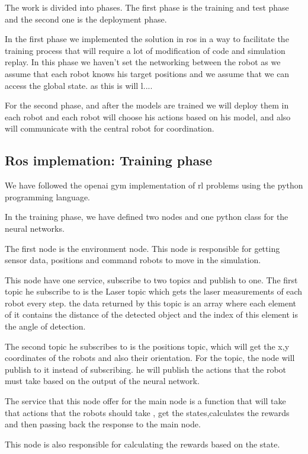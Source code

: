 \documentclass[12pt]{extarticle}
\begin{document}
The work is divided into phases. The first phase is the training and test phase and the second one is the deployment phase.

In the first phase we implemented the solution in ros in a way to facilitate the training process that will require a lot of modification of code and simulation replay. In this phase   we haven't set the networking between the robot as we assume that each robot knows his target positions and we assume that we can access the global state.  as this is will l....


For the second phase, and after the models are trained we will deploy them in each robot and each robot will choose his actions based on his model, and also will communicate with the central robot for coordination.


\subsection{Ros implemation: Training phase}

We have followed the openai gym implementation of  rl problems using the python programming language.

In the training phase, we have defined two nodes and one python class for the neural networks.
 

The first node is the environment node. This node is responsible for getting sensor data, positions and command robots to move in the simulation.

This node have one service, subscribe to  two topics and publish to one. The first topic he subscribe to is the Laser topic which gets the laser measurements of each robot every step. the data returned   by this topic is an array where each element of it contains the distance of the detected object and the index of this element is the angle of detection.


The second topic he subscribes to is the positions topic, which will get the x,y coordinates of the robots and also their orientation. For the topic, the node will publish to it instead of subscribing. he will publish the actions that the robot must take based on the output of the neural network.

The service that this node offer for the main node is  a function that will take that actions that the robots should take , get the states,calculates the rewards and then passing back the response to the main node. 

This node is also responsible for calculating the rewards based on the state.
\end{document}

